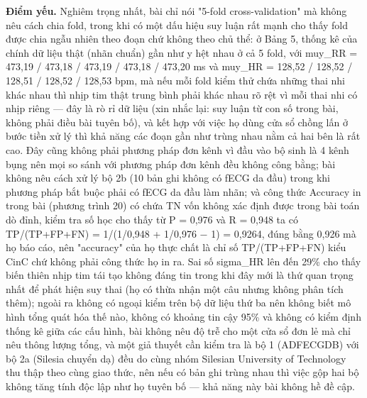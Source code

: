 \documentclass[12pt,a4paper]{article}
\begin{document}
\noindent \textbf{Điểm yếu.} Nghiêm trọng nhất, bài chỉ nói "5-fold cross-validation" mà không nêu cách chia fold, trong khi có một dấu hiệu suy luận rất mạnh cho thấy fold được chia ngẫu nhiên theo đoạn chứ không theo chủ thể: ở Bảng 5, thống kê của chính dữ liệu thật (nhãn chuẩn) gần như y hệt nhau ở cả 5 fold, với muy\_RR = 473,19 / 473,18 / 473,19 / 473,18 / 473,20 ms và muy\_HR = 128,52 / 128,52 / 128,51 / 128,52 / 128,53 bpm, mà nếu mỗi fold kiểm thử chứa những thai nhi khác nhau thì nhịp tim thật trung bình phải khác nhau rõ rệt vì mỗi thai nhi có nhịp riêng — đây là rò rỉ dữ liệu (xin nhắc lại: suy luận từ con số trong bài, không phải điều bài tuyên bố), và kết hợp với việc họ dùng cửa sổ chồng lấn ở bước tiền xử lý thì khả năng các đoạn gần như trùng nhau nằm cả hai bên là rất cao. Đây cũng không phải phương pháp đơn kênh vì đầu vào bộ sinh là 4 kênh bụng nên mọi so sánh với phương pháp đơn kênh đều không công bằng; bài không nêu cách xử lý bộ 2b (10 bản ghi không có fECG da đầu) trong khi phương pháp bắt buộc phải có fECG da đầu làm nhãn; và công thức Accuracy in trong bài (phương trình 20) có chứa TN vốn không xác định được trong bài toán dò đỉnh, kiểm tra số học cho thấy từ P = 0,976 và R = 0,948 ta có TP/(TP+FP+FN) = 1/(1/0,948 + 1/0,976 − 1) = 0,9264, đúng bằng 0,926 mà họ báo cáo, nên "accuracy" của họ thực chất là chỉ số TP/(TP+FP+FN) kiểu CinC chứ không phải công thức họ in ra. Sai số sigma\_HR lên đến 29\% cho thấy biến thiên nhịp tim tái tạo không đáng tin trong khi đây mới là thứ quan trọng nhất để phát hiện suy thai (họ có thừa nhận một câu nhưng không phân tích thêm); ngoài ra không có ngoại kiểm trên bộ dữ liệu thứ ba nên không biết mô hình tổng quát hóa thế nào, không có khoảng tin cậy 95\% và không có kiểm định thống kê giữa các cấu hình, bài không nêu độ trễ cho một cửa sổ đơn lẻ mà chỉ nêu thông lượng tổng, và một giả thuyết cần kiểm tra là bộ 1 (ADFECGDB) với bộ 2a (Silesia chuyển dạ) đều do cùng nhóm Silesian University of Technology thu thập theo cùng giao thức, nên nếu có bản ghi trùng nhau thì việc gộp hai bộ không tăng tính độc lập như họ tuyên bố — khả năng này bài không hề đề cập.\par\vspace{3pt}
\end{document}
